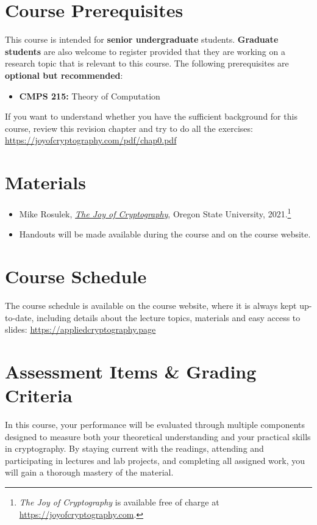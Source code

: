 \documentclass[10pt,a4paper,american]{article}
\begin{document}
\section{Course Prerequisites}
This course is intended for \textbf{senior undergraduate} students. \textbf{Graduate students} are also welcome to register provided that they are working on a research topic that is relevant to this course. The following prerequisites are \textbf{optional but recommended}:

\begin{itemize}
	\item \textbf{CMPS 215:} Theory of Computation
\end{itemize}

If you want to understand whether you have the sufficient background for this course, review this revision chapter and try to do all the exercises: \url{https://joyofcryptography.com/pdf/chap0.pdf}

\section{Materials}
\begin{itemize}
	\item Mike Rosulek, {\href{https://joyofcryptography.com}{\textit{The Joy of Cryptography}}}, Oregon State University, 2021.\footnote{\textit{The Joy of Cryptography} is available free of charge at \url{https://joyofcryptography.com}.}
	\item Handouts will be made available during the course and on the course website.
\end{itemize}

\section{Course Schedule}
The course schedule is available on the course website, where it is always kept up-to-date, including details about the lecture topics, materials and easy access to slides: \url{https://appliedcryptography.page}

\section{Assessment Items \& Grading Criteria}
In this course, your performance will be evaluated through multiple components designed to measure both your theoretical understanding and your practical skills in cryptography. By staying current with the readings, attending and participating in lectures and lab projects, and completing all assigned work, you will gain a thorough mastery of the material.
\end{document}
